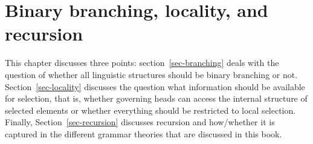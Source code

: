 
\chapter{Binary branching, locality, and recursion}

This chapter discusses three points: section~\ref{sec-branching} deals with the question of whether all
linguistic structures should be binary branching or not. Section~\ref{sec-locality} discusses the
question what information should be available for selection, that is, whether governing heads can
access the internal structure of selected elements or whether everything should be restricted to
local selection. Finally, Section~\ref{sec-recursion} discusses recursion and how/whether it is
captured in the different grammar theories that are discussed in this book.





